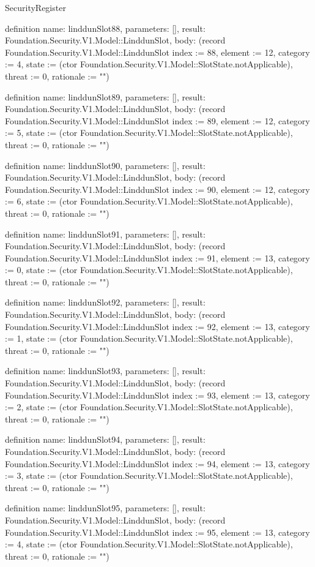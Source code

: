 \begin{lexlean}{SecurityRegister}
\begin{semanticmodule}
definition{
  name: linddunSlot88,
  parameters: [],
  result: Foundation.Security.V1.Model::LinddunSlot,
  body: (record Foundation.Security.V1.Model::LinddunSlot {index := 88, element := 12, category := 4, state := (ctor Foundation.Security.V1.Model::SlotState.notApplicable), threat := 0, rationale := ""})
}

definition{
  name: linddunSlot89,
  parameters: [],
  result: Foundation.Security.V1.Model::LinddunSlot,
  body: (record Foundation.Security.V1.Model::LinddunSlot {index := 89, element := 12, category := 5, state := (ctor Foundation.Security.V1.Model::SlotState.notApplicable), threat := 0, rationale := ""})
}

definition{
  name: linddunSlot90,
  parameters: [],
  result: Foundation.Security.V1.Model::LinddunSlot,
  body: (record Foundation.Security.V1.Model::LinddunSlot {index := 90, element := 12, category := 6, state := (ctor Foundation.Security.V1.Model::SlotState.notApplicable), threat := 0, rationale := ""})
}

definition{
  name: linddunSlot91,
  parameters: [],
  result: Foundation.Security.V1.Model::LinddunSlot,
  body: (record Foundation.Security.V1.Model::LinddunSlot {index := 91, element := 13, category := 0, state := (ctor Foundation.Security.V1.Model::SlotState.notApplicable), threat := 0, rationale := ""})
}

definition{
  name: linddunSlot92,
  parameters: [],
  result: Foundation.Security.V1.Model::LinddunSlot,
  body: (record Foundation.Security.V1.Model::LinddunSlot {index := 92, element := 13, category := 1, state := (ctor Foundation.Security.V1.Model::SlotState.notApplicable), threat := 0, rationale := ""})
}

definition{
  name: linddunSlot93,
  parameters: [],
  result: Foundation.Security.V1.Model::LinddunSlot,
  body: (record Foundation.Security.V1.Model::LinddunSlot {index := 93, element := 13, category := 2, state := (ctor Foundation.Security.V1.Model::SlotState.notApplicable), threat := 0, rationale := ""})
}

definition{
  name: linddunSlot94,
  parameters: [],
  result: Foundation.Security.V1.Model::LinddunSlot,
  body: (record Foundation.Security.V1.Model::LinddunSlot {index := 94, element := 13, category := 3, state := (ctor Foundation.Security.V1.Model::SlotState.notApplicable), threat := 0, rationale := ""})
}

definition{
  name: linddunSlot95,
  parameters: [],
  result: Foundation.Security.V1.Model::LinddunSlot,
  body: (record Foundation.Security.V1.Model::LinddunSlot {index := 95, element := 13, category := 4, state := (ctor Foundation.Security.V1.Model::SlotState.notApplicable), threat := 0, rationale := ""})
}


\end{semanticmodule}
\end{lexlean}
